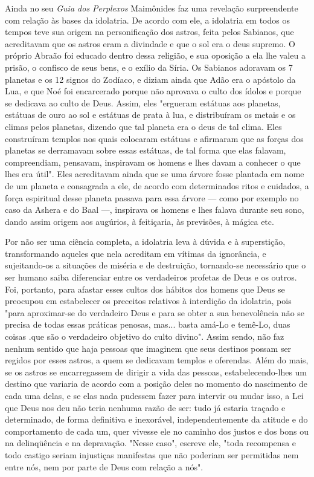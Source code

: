 \begin{itemize}
\begin{enumrate}
Ainda no seu \emph{Guia dos Perplexos} Maimônides faz uma revelação
sur­preendente com relação às bases da idolatria. De acordo com ele, a
idolatria em todos os tempos teve sua origem na personificação dos
astros, feita pelos Sabianos, que acreditavam que os astros eram a
divindade e que o sol era o deus supremo. O próprio Abraão foi educado
dentro dessa religião, e sua opo­sição a ela lhe valeu a prisão, o
confisco de seus bens, e o exílio da Síria. Os Sabianos adoravam os 7
planetas e os 12 signos do Zodíaco, e diziam ainda que Adão era o
apóstolo da Lua, e que Noé foi encarcerado porque não aprovava o culto
dos ídolos e porque se dedicava ao culto de Deus. Assim, eles "ergue­ram
estátuas aos planetas, estátuas de ouro ao sol e estátuas de prata à
lua, e distribuíram os metais e os climas pelos planetas, dizendo que
tal planeta era o deus de tal clima. Eles construíram templos nos quais
colocaram estátuas e afirmaram que as forças dos planetas se derramavam
sobre essas estátuas, de tal forma que elas falavam, compreendiam,
pensavam, inspiravam os homens e lhes davam a conhecer o que lhes era
útil". Eles acreditavam ainda que se uma árvore fosse plantada em nome
de um planeta e consagrada a ele, de acor­do com determinados ritos e
cuidados, a força espiritual desse planeta passava para essa árvore ---
como por exemplo no caso da Ashera e do Baal ---, inspira­va os homens e
lhes falava durante seu sono, dando assim origem aos augúrios, à
feitiçaria, às previsões, à mágica etc.

Por não ser uma ciência completa, a idolatria leva à dúvida e à
su­perstição, transformando aqueles que nela acreditam em vítimas da
ignorância, e sujeitando-os a situações de miséria e de destruição,
tornando-se necessário que o ser humano saiba diferenciar entre os
verdadeiros profetas de Deus e os outros. Foi, portanto, para afastar
esses cultos dos hábitos dos homens que Deus se preocupou em estabelecer
os preceitos relativos à interdição da idolatria, pois "para
aproximar-se do verdadeiro Deus e para se obter a sua benevolência não
se precisa de todas essas práticas penosas, mas... basta amá-Lo e
temê-Lo, duas coisas .que são o verdadeiro objetivo do culto divino".
Assim sendo, não faz nenhum sentido que haja pessoas que imaginem que
seus destinos possam ser regidos por esses astros, a quem se dedicavam
templos e oferendas. Além do mais, se os astros se encarregassem de
dirigir a vida das pessoas, estabelecendo-lhes um destino que variaria
de acordo com a posição deles no momento do
nascimento de cada uma delas, e se elas nada pudessem fazer para
intervir ou mudar isso, a Lei que Deus nos deu não teria nenhuma razão
de ser: tudo já estaria traçado e determinado, de forma definitiva e
inexorável, independente­mente da atitude e do comportamento de cada um,
quer vivesse ele no cami­nho dos justos e dos bons ou na delinqüência e
na depravação. "Nesse caso", escreve ele, "toda recompensa e todo
castigo seriam injustiças manifestas que não poderiam ser permitidas nem
entre nós, nem por parte de Deus com rela­ção a nós".


\end{enumrate}
\end{itemize}
